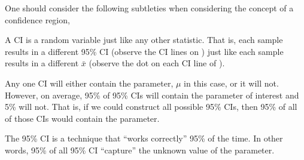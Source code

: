 \documentclass[10pt,openany]{book}\usepackage[]{graphicx}\usepackage[]{color}
\begin{document}

\begin{minipage}{\textwidth}
One should consider the following subtleties when considering the concept of a confidence region,
\begin{Itemize}
  \item A CI is a random variable just like any other statistic. That is, each sample results in a different 95\% CI (observe the CI lines on ) just like each sample results in a different $\bar{x}$ (observe the dot on each CI line of ).
  \item Any one CI will either contain the parameter, $\mu$ in this case, or it will not.  However, on average, 95\% of 95\% CIs will contain the parameter of interest and 5\% will not.  That is, if we could construct all possible 95\% CIs, then 95\% of all of those CIs would contain the parameter.
  \item The 95\% CI is a technique that ``works correctly'' 95\% of the time.  In other words, 95\% of all 95\% CI ``capture'' the unknown value of the parameter.
\end{Itemize}
\end{minipage}
\end{document}
